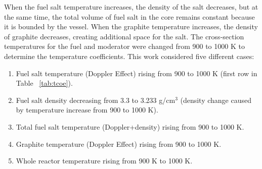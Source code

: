 When the fuel salt temperature increases, the density of the salt decreases, 
but at the same time, the total volume of fuel salt in the 
core remains constant because it
is bounded by the vessel. When the graphite 
temperature increases, the density of
graphite decreases, creating additional 
space for the salt. The cross-section temperatures for the fuel and moderator 
were changed from 900 to 1000 K to determine the temperature coefficients. 
This work considered five different cases:
\begin{enumerate}
	\item Fuel salt temperature (Doppler Effect) rising from 900 to 1000 K 
	(first row  in Table ~\ref{tab:tcoe}).
	\item Fuel salt density decreasing from 3.3 to 3.233 g/cm$^3$ 
	(density change caused by temperature increase from	900 to 1000 K).
	\item Total fuel salt temperature (Doppler+density) rising from 900 to 
	1000 K.	
	\item Graphite temperature (Doppler Effect) rising from 900 to 1000 K.
	\item Whole reactor temperature rising from 900 K to 1000 K.
\end{enumerate}

